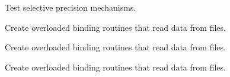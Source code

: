 \begin{DoxyRefList}
Test selective precision mechanisms.  
\item[\label{todo__todo000006}%
\hypertarget{todo__todo000006}{}%
File \hyperlink{mtk__uni__stg__grid__1d_8h}{mtk\+\_\+uni\+\_\+stg\+\_\+grid\+\_\+1d.h} ]Create overloaded binding routines that read data from files.  
\item[\label{todo__todo000009}%
\hypertarget{todo__todo000009}{}%
File \hyperlink{mtk__uni__stg__grid__2d_8h}{mtk\+\_\+uni\+\_\+stg\+\_\+grid\+\_\+2d.h} ]Create overloaded binding routines that read data from files.  
\item[\label{todo__todo000012}%
\hypertarget{todo__todo000012}{}%
File \hyperlink{mtk__uni__stg__grid__3d_8h}{mtk\+\_\+uni\+\_\+stg\+\_\+grid\+\_\+3d.h} ]Create overloaded binding routines that read data from files. 
\end{DoxyRefList}